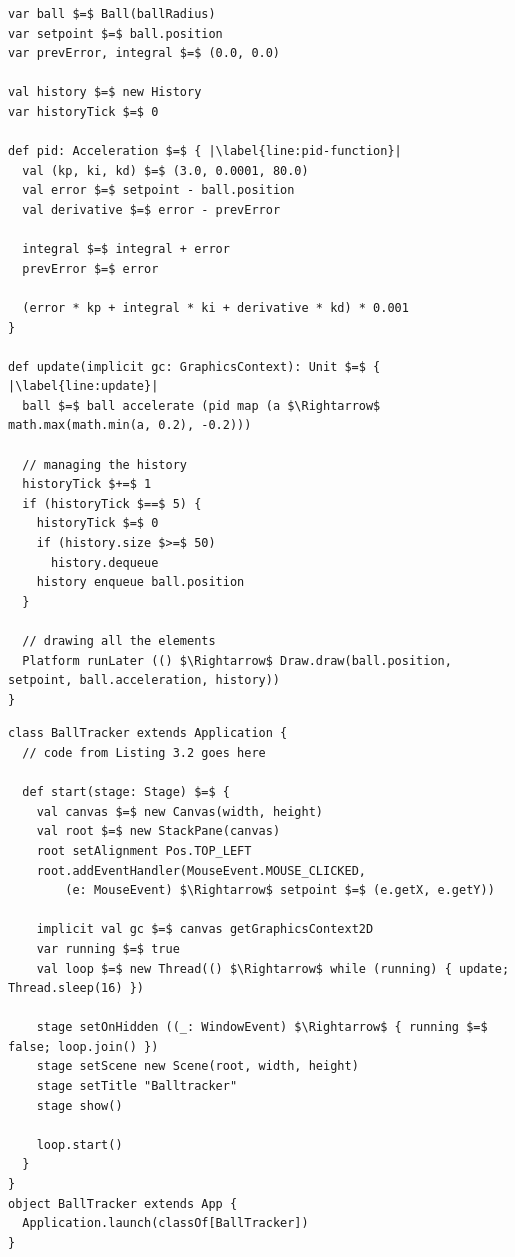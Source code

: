 \begin{minipage}{\linewidth}
\begin{lstlisting}[style=ScalaStyle, caption={Ball drawing}, label={lst:ball-feedback}]
var ball $=$ Ball(ballRadius)
var setpoint $=$ ball.position
var prevError, integral $=$ (0.0, 0.0)

val history $=$ new History
var historyTick $=$ 0

def pid: Acceleration $=$ { |\label{line:pid-function}|
  val (kp, ki, kd) $=$ (3.0, 0.0001, 80.0)
  val error $=$ setpoint - ball.position
  val derivative $=$ error - prevError

  integral $=$ integral + error
  prevError $=$ error

  (error * kp + integral * ki + derivative * kd) * 0.001
}

def update(implicit gc: GraphicsContext): Unit $=$ { |\label{line:update}|
  ball $=$ ball accelerate (pid map (a $\Rightarrow$ math.max(math.min(a, 0.2), -0.2)))

  // managing the history
  historyTick $+=$ 1
  if (historyTick $==$ 5) {
    historyTick $=$ 0
    if (history.size $>=$ 50)
      history.dequeue
    history enqueue ball.position
  }

  // drawing all the elements
  Platform runLater (() $\Rightarrow$ Draw.draw(ball.position, setpoint, ball.acceleration, history))
}
\end{lstlisting}
\begin{lstlisting}[style=ScalaStyle, caption={Ball drawing}, label={lst:ball-drawing}]
class BallTracker extends Application {
  // code from Listing 3.2 goes here

  def start(stage: Stage) $=$ {
    val canvas $=$ new Canvas(width, height)
    val root $=$ new StackPane(canvas)
    root setAlignment Pos.TOP_LEFT
    root.addEventHandler(MouseEvent.MOUSE_CLICKED,
        (e: MouseEvent) $\Rightarrow$ setpoint $=$ (e.getX, e.getY))

    implicit val gc $=$ canvas getGraphicsContext2D
    var running $=$ true
    val loop $=$ new Thread(() $\Rightarrow$ while (running) { update; Thread.sleep(16) })

    stage setOnHidden ((_: WindowEvent) $\Rightarrow$ { running $=$ false; loop.join() })
    stage setScene new Scene(root, width, height)
    stage setTitle "Balltracker"
    stage show()

    loop.start()
  }
}
object BallTracker extends App {
  Application.launch(classOf[BallTracker])
}
\end{lstlisting}
\end{minipage}


